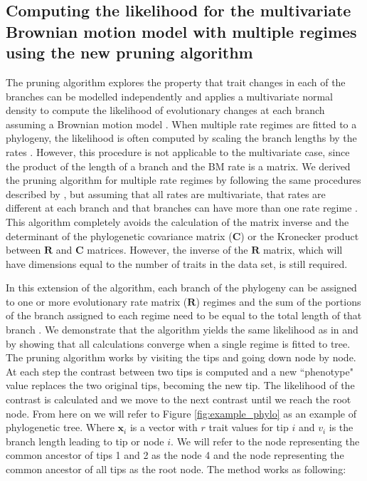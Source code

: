 \subsection{Computing the likelihood for the multivariate Brownian motion model with multiple regimes using the new pruning algorithm}

The pruning algorithm explores the property that trait changes in each of the branches can be modelled independently and applies a multivariate normal density to compute the likelihood of evolutionary changes at each branch assuming a Brownian motion model \citep{felsenstein_inferring_2004, freckleton_fast_2012}. When multiple rate regimes are fitted to a phylogeny, the likelihood is often computed by scaling the branch lengths by the rates \citep[e.g.,][]{Eastman_2011}. However, this procedure is not applicable to the multivariate case, since the product of the length of a branch and the BM rate is a matrix. We derived the pruning algorithm for multiple rate regimes by following the same procedures described by \citet{felsenstein_1973, felsenstein_inferring_2004}, but assuming that all rates are multivariate, that rates are different at each branch and that branches can have more than one rate regime \citep[after][]{revell_phylogenetic_2009}. This algorithm completely avoids the calculation of the matrix inverse and the determinant of the phylogenetic covariance matrix ($\mathbf{C}$) or the Kronecker product between $\mathbf{R}$ and $\mathbf{C}$ matrices. However, the inverse of the $\mathbf{R}$ matrix, which will have dimensions equal to the number of traits in the data set, is still required.

In this extension of the algorithm, each branch of the phylogeny can be assigned to one or more evolutionary rate matrix ($\mathbf{R}$) regimes and the sum of the portions of the branch assigned to each regime need to be equal to the total length of that branch \citep{revell_phylogenetic_2009}. We demonstrate that the algorithm yields the same likelihood as in \citet{felsenstein_1973} and \citet{freckleton_fast_2012} by showing that all calculations converge when a single regime is fitted to tree. The pruning algorithm works by visiting the tips and going down node by node. At each step the contrast between two tips is computed and a new ``phenotype" value replaces the two original tips, becoming the new tip. The likelihood of the contrast is calculated and we move to the next contrast until we reach the root node. From here on we will refer to Figure \ref{fig:example_phylo} as an example of phylogenetic tree. Where $\mathbf{x}_{i}$ is a vector with $r$ trait values for tip $i$ and $v_{i}$ is the branch length leading to tip or node $i$. We will refer to the node representing the common ancestor of tips 1 and 2 as the node 4 and the node representing the common ancestor of all tips as the root node. The method works as following:

